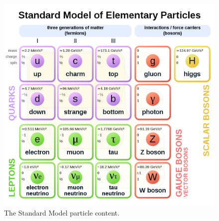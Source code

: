 \begin{figure}
\centering
\includegraphics[scale=0.4]{figures/intro/sm_particles.png}
\caption{The Standard Model particle content.}
\label{sm_particles}
\end{figure}